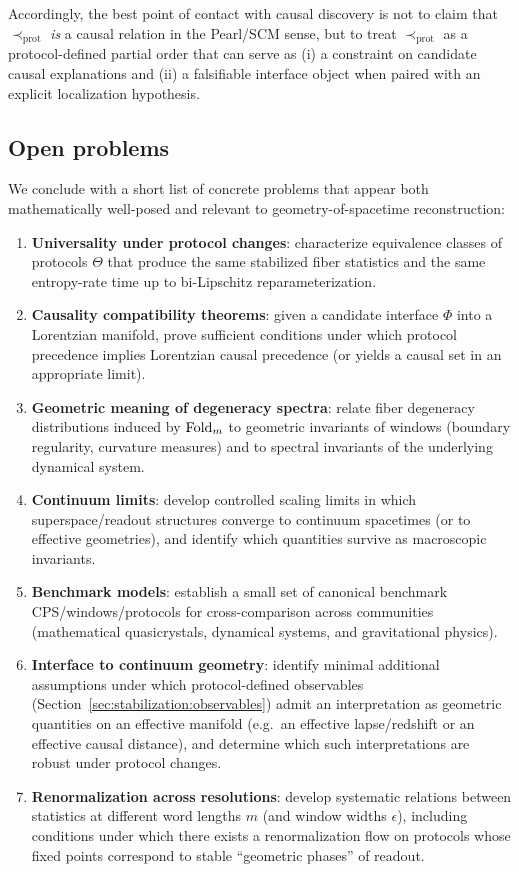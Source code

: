 Accordingly, the best point of contact with causal discovery is not to claim that \(\prec_{\mathrm{prot}}\) \emph{is} a causal relation in the Pearl/SCM sense, but to treat \(\prec_{\mathrm{prot}}\) as a protocol-defined partial order that can serve as (i) a constraint on candidate causal explanations and (ii) a falsifiable interface object when paired with an explicit localization hypothesis.

\subsection{Open problems}\label{sec:discussion:open-problems}

We conclude with a short list of concrete problems that appear both mathematically well-posed and relevant to geometry-of-spacetime reconstruction:
\begin{enumerate}[label=\textbf{O\arabic*.},leftmargin=*,itemsep=2pt]
  \item \textbf{Universality under protocol changes}: characterize equivalence classes of protocols $\Theta$ that produce the same stabilized fiber statistics and the same entropy-rate time up to bi-Lipschitz reparameterization.
  \item \textbf{Causality compatibility theorems}: given a candidate interface $\Phi$ into a Lorentzian manifold, prove sufficient conditions under which protocol precedence implies Lorentzian causal precedence (or yields a causal set in an appropriate limit).
  \item \textbf{Geometric meaning of degeneracy spectra}: relate fiber degeneracy distributions induced by $\mathrm{Fold}_m$ to geometric invariants of windows (boundary regularity, curvature measures) and to spectral invariants of the underlying dynamical system.
  \item \textbf{Continuum limits}: develop controlled scaling limits in which superspace/readout structures converge to continuum spacetimes (or to effective geometries), and identify which quantities survive as macroscopic invariants.
  \item \textbf{Benchmark models}: establish a small set of canonical benchmark CPS/windows/protocols for cross-comparison across communities (mathematical quasicrystals, dynamical systems, and gravitational physics).
\item \textbf{Interface to continuum geometry}: identify minimal additional assumptions under which protocol-defined observables (Section~\ref{sec:stabilization:observables}) admit an interpretation as geometric quantities on an effective manifold (e.g.\ an effective lapse/redshift or an effective causal distance), and determine which such interpretations are robust under protocol changes.
\item \textbf{Renormalization across resolutions}: develop systematic relations between statistics at different word lengths $m$ (and window widths $\epsilon$), including conditions under which there exists a renormalization flow on protocols whose fixed points correspond to stable ``geometric phases'' of readout.
\end{enumerate}

